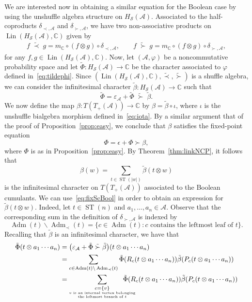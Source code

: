 \documentclass[pdftex]{sigma}%
\numberwithin{equation}{section}
\newcommand{\A}{\mathcal{A}}
\newcommand{\ST}{\operatorname{ST}}
\newcommand{\cHS}{H_\mathcal{S}}
\begin{document}
We are interested now in obtaining a similar equation for the Boolean case by using the unshuffle algebra structure on $\cHS(\A)$. Associated to the half-coproducts $\delta_{\prec,\A}$ and $\delta_{\succ,\A}$, we have two non-associative products on $\operatorname{Lin}(\cHS(\A),\mathbb{C})$ given by
\begin{gather*}
f \;\tilde{\prec}\; g = m_\mathbb{C}\circ (f\otimes g) \circ \delta_{\prec,\A},
\qquad f\; \tilde{\succ} \;g = m_\mathbb{C}\circ (f\otimes g) \circ \delta_{\succ,\A},
\end{gather*}
for any $f,g\in \operatorname{Lin}(\cHS(\A),\mathbb{C})$. Now, let $(\A,\varphi)$ be a noncommutative probability space and let $\tilde\Phi\colon \cHS(\A)\to\mathbb{C}$ be the character associated to $\varphi$ defined in~\eqref{eq:tildephi}. Since $(\operatorname{Lin}(\cHS(\A),\mathbb{C}),\tilde{\prec},\tilde{\succ})$ is a shuffle algebra, we can consider the infinitesimal character $\tilde{\beta}\colon \cHS(\A)\to\mathbb{C}$ such that
\begin{equation}\label{eq:fixScBool}
\tilde\Phi = \varepsilon_\A + \tilde\Phi\; \tilde\succ\; \tilde\beta.
\end{equation}
We now define the map $\beta\colon T(T_+(\A))\to\mathbb{C}$ by $\beta = \tilde{\beta}\circ \iota$, where $\iota$ is the unshuffle bialgebra morphism defined in~\eqref{eq:iota}. By a similar argument that of the proof of Proposition~\ref{prop:easy}, we conclude that $\beta$ satisfies the fixed-point equation
\[
\Phi = \epsilon + \Phi \succ \beta,
\]
where $\Phi$ is as in Proposition~\ref{prop:easy}. By Theorem~\ref{thm:linkNCP}, it follows that
\[
\beta(w) = \sum_{t\in \ST(|w|)} \tilde{\beta}(t\otimes w)
\]
is the infinitesimal character on $T(T_+(\A))$ associated to the Boolean cumulants. We can use~\eqref{eq:fixScBool} in order to obtain an expression for $\tilde\beta(t\otimes w)$. Indeed, let $t\in \ST(n)$ and $a_1,\dots,a_n\in \A$. Observe that the corresponding sum in the definition of $\delta_{\succ,\A}$ is indexed by
\[\operatorname{Adm}(t) \backslash \operatorname{Adm}_\prec(t) = \{c\in \operatorname{Adm}(t)\colon \mbox{$c$ contains the leftmost leaf of $t$} \}.\]
Recalling that $\tilde \beta$ is an infinitesimal character, we have that
\begin{align*}
\tilde\Phi(t\otimes a_1\cdots a_n) &= \big(\varepsilon_\A + \tilde\Phi\; \tilde\succ\; \tilde\beta\big)(t\otimes a_1\cdots a_n) \\&= \sum_{c\in \operatorname{Adm}(t) \backslash \operatorname{Adm}_\prec(t)} \tilde{\Phi} (R_c(t\otimes a_1\cdots a_n)) \tilde\beta(P_c(t\otimes a_1\cdots a_n))\\
&= \sum_{\substack{c=\{v\}\\\mbox{\tiny{$v$ is an internal vertex belonging}}\\\mbox{\tiny{ the leftmost branch of $t$ }}}} \hspace{-0.7cm}\tilde{\Phi} (R_c(t\otimes a_1\cdots a_n)) \tilde\beta(P_c(t\otimes a_1\cdots a_n))
\end{align*}
\end{document}
